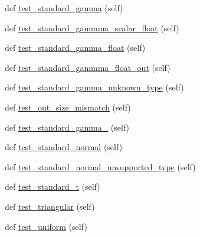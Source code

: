 \begin{DoxyCompactItemize}
\item 
def \hyperlink{classnumpy_1_1random_1_1tests_1_1test__generator__mt19937_1_1TestRandomDist_ac9bf433a5ab5a2b1a81c9dd41269b6db}{test\+\_\+standard\+\_\+gamma} (self)
\item 
def \hyperlink{classnumpy_1_1random_1_1tests_1_1test__generator__mt19937_1_1TestRandomDist_ac2315cc8b0fc16f1801e158096bc38c5}{test\+\_\+standard\+\_\+gammma\+\_\+scalar\+\_\+float} (self)
\item 
def \hyperlink{classnumpy_1_1random_1_1tests_1_1test__generator__mt19937_1_1TestRandomDist_a271df986932e87cfa1b384ca14bcabd9}{test\+\_\+standard\+\_\+gamma\+\_\+float} (self)
\item 
def \hyperlink{classnumpy_1_1random_1_1tests_1_1test__generator__mt19937_1_1TestRandomDist_a105f07901276206b5cd4c9bb334737fb}{test\+\_\+standard\+\_\+gammma\+\_\+float\+\_\+out} (self)
\item 
def \hyperlink{classnumpy_1_1random_1_1tests_1_1test__generator__mt19937_1_1TestRandomDist_ad79d2507c39d7d9a7d139ff8bed225a7}{test\+\_\+standard\+\_\+gamma\+\_\+unknown\+\_\+type} (self)
\item 
def \hyperlink{classnumpy_1_1random_1_1tests_1_1test__generator__mt19937_1_1TestRandomDist_a74568d09f76969c8457af7048c9687e8}{test\+\_\+out\+\_\+size\+\_\+mismatch} (self)
\item 
def \hyperlink{classnumpy_1_1random_1_1tests_1_1test__generator__mt19937_1_1TestRandomDist_a6d27c40e2157d30cc8d9fbc5fbbfe303}{test\+\_\+standard\+\_\+gamma\+\_} (self)
\item 
def \hyperlink{classnumpy_1_1random_1_1tests_1_1test__generator__mt19937_1_1TestRandomDist_a40780115191be4d94f4e78de3893b918}{test\+\_\+standard\+\_\+normal} (self)
\item 
def \hyperlink{classnumpy_1_1random_1_1tests_1_1test__generator__mt19937_1_1TestRandomDist_aaf512186bdc8bbfa22d06dea0b75ad6e}{test\+\_\+standard\+\_\+normal\+\_\+unsupported\+\_\+type} (self)
\item 
def \hyperlink{classnumpy_1_1random_1_1tests_1_1test__generator__mt19937_1_1TestRandomDist_a00691221abfdad2ac8179a21d65f4d96}{test\+\_\+standard\+\_\+t} (self)
\item 
def \hyperlink{classnumpy_1_1random_1_1tests_1_1test__generator__mt19937_1_1TestRandomDist_aab787c93a71d9828428bb990c038f3e6}{test\+\_\+triangular} (self)
\item 
def \hyperlink{classnumpy_1_1random_1_1tests_1_1test__generator__mt19937_1_1TestRandomDist_ac2422f2a1fd6fc41f384321a798429b9}{test\+\_\+uniform} (self)

\end{DoxyCompactItemize}
